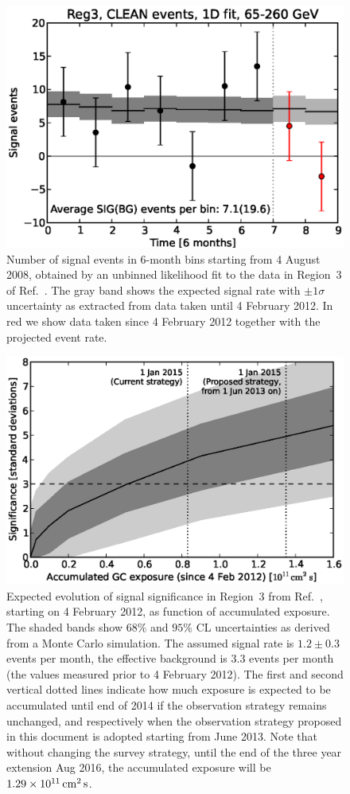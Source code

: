 \documentclass[aps,prd,superscriptaddress,nofootinbib,fixlfloat, 12pt]{revtex4-1}
\begin{document}
\begin{figure}[h]
  \begin{center}
    \includegraphics[width=0.60\linewidth]{plots/semester_fluxes.eps}
    \vspace{-0.5cm}
  \end{center}
  \caption{Number of signal events in 6-month bins starting from 4
    August 2008, obtained by an unbinned likelihood fit to the data in
    Region~3 of Ref.~\cite{Weniger:2012}. The gray band shows the expected
    signal rate with $\pm1\sigma$ uncertainty as extracted from data taken until
    4 February 2012.
    In red we show data taken since 4 February 2012
    together with the projected event rate.}
  \label{fig:semester_fluxes}
\end{figure}

\begin{figure}[h]
  \begin{center}
    \includegraphics[width=0.6\linewidth]{plots/projection.eps}
    \vspace{-0.5cm}
  \end{center}
  \caption{
    Expected evolution of signal significance in Region~3 from
    Ref.~\cite{Weniger:2012}, starting on 4
    February 2012, as function of
    accumulated exposure.  The shaded bands show $68\%$ and $95\%$ CL
    uncertainties as derived from a Monte Carlo simulation.  The assumed
    signal rate is $1.2\pm 0.3$ events per month, the effective background is
    $3.3$ events per month (the values measured prior to 4 February 2012).
    The first and second vertical dotted lines indicate how much exposure is
    expected to be accumulated until end of 2014 if the observation strategy remains
    unchanged, and respectively when the observation strategy proposed in this
    document is adopted starting from June 2013. Note that without changing
    the survey strategy, until the end of the three year extension Aug 2016,
    the accumulated exposure will be $1.29\times10^{11}\rm\,cm^2\,s$.}
  \label{fig:projection}
\end{figure}
\end{document}
